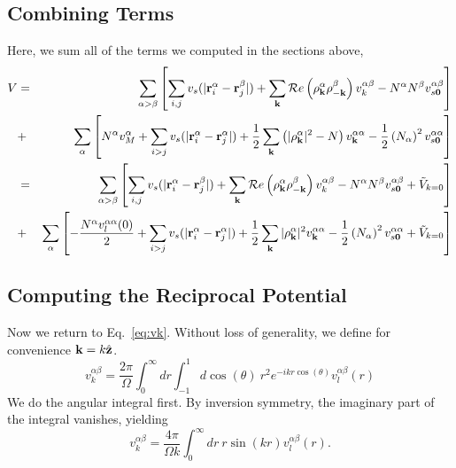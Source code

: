 \subsection{Combining Terms}
Here, we sum all of the terms we computed in the sections above,
\begin{eqnarray}
V & = & \sum_{\alpha > \beta} \left[\sum_{i,j} v_s(|\mathbf{r}_i^\alpha
  -\mathbf{r}_j^\beta|) + \sum_{\mathbf{k}} \mathcal{R}e\left(\rho_{\mathbf{k}}^\alpha
  \rho_{-\mathbf{k}}^\beta\right)v^{\alpha\beta}_k  -N^\alpha N^\beta
  v^{\alpha \beta}_{s\mathbf{0}}  \right] \nonumber \\
& + & \sum_\alpha \left[ N^\alpha v_M^\alpha + \sum_{i>j} v_s(|\mathbf{r}_i^\alpha -
  \mathbf{r}_j^\alpha|) + \frac{1}{2} \sum_{\mathbf{k}} \left( |\rho_{\mathbf{k}}^\alpha|^2 -
  N\right) v^{\alpha\alpha}_{\mathbf{k}} -\frac{1}{2}\left(N_\alpha\right)^2 v_{s\mathbf{0}}^{\alpha\alpha}\right] \nonumber \\
& = & \sum_{\alpha > \beta} \left[\sum_{i,j} v_s(|\mathbf{r}_i^\alpha
  -\mathbf{r}_j^\beta|) + \sum_{\mathbf{k}} \mathcal{R}e\left(\rho_{\mathbf{k}}^\alpha
  \rho_{-\mathbf{k}}^\beta\right) v^{\alpha \beta}_k   -N^\alpha N^\beta
  v^{\alpha \beta}_{s\mathbf{0}}  +\tilde{V}_{k=0} \right] \\
& + & \sum_\alpha \left[ -\frac{N^\alpha v_l^{\alpha \alpha}(0)}{2}  + \sum_{i>j} v_s(|\mathbf{r}_i^\alpha -
  \mathbf{r}_j^\alpha|) + \frac{1}{2} \sum_{\mathbf{k}} |\rho_{\mathbf{k}}^\alpha|^2 v^{\alpha\alpha}_{\mathbf{k}} - \frac{1}{2}\left(N_\alpha\right)^2
  v_{s\mathbf{0}}^{\alpha\alpha} +\tilde{V}_{k=0}\right]  \nonumber
\end{eqnarray}

\subsection {Computing the Reciprocal Potential}
Now we return to Eq.~\ref{eq:vk}.  Without loss of generality, we define
for convenience $\mathbf{k} = k\hat{\mathbf{z}}$.
\begin{equation}
v^{\alpha \beta}_k = \frac{2\pi}{\Omega} \int_0^\infty dr \int_{-1}^1
  d\cos(\theta) \ r^2 e^{-i k r \cos(\theta)} v_l^{\alpha \beta}(r)
\end{equation}
We do the angular integral first.  By inversion symmetry, the
imaginary part of the integral vanishes, yielding
\begin{equation}
v^{\alpha \beta}_k = \frac{4\pi}{\Omega k}\int _0^\infty dr\ r \sin(kr)
v^{\alpha \beta}_l(r).
\label{eq:vkint}
\end{equation}


